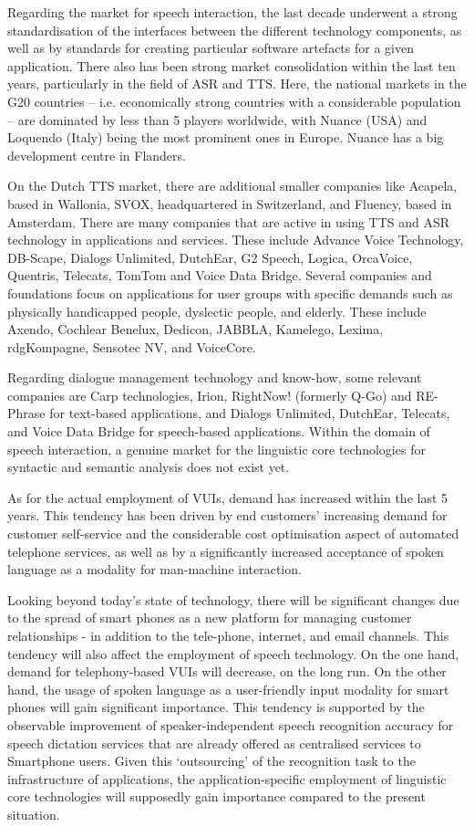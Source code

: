 \documentclass{scrartcl}
\begin{document}
\begin{Parallel}[c]{70mm}{70mm}
{    Regarding the market for speech interaction, the last decade underwent a strong standardisation of the interfaces between the different technology components, as well as by standards for creating particular software artefacts for a given application. There also has been strong market consolidation within the last ten years, particularly in the field of ASR and TTS. Here, the national markets in the G20 countries -- i.e. economically strong countries with a considerable population -- are dominated by less than 5 players worldwide, with Nuance (USA) and Loquendo (Italy) being the most prominent ones in Europe. Nuance has a big development centre in Flanders.

    On the Dutch TTS market, there are additional smaller companies like Acapela, based in Wallonia, SVOX, headquartered in Switzerland, and Fluency, based in Amsterdam. There are many companies that are active in using TTS and ASR technology in applications and services. These include Advance Voice Technology, DB-Scape, Dialogs Unlimited, DutchEar,   G2 Speech,  Logica, OrcaVoice, Quentris, Telecats, TomTom and Voice Data Bridge. Several companies and foundations focus on applications for user groups with specific demands such as physically handicapped people, dyslectic people, and elderly. These include Axendo, Cochlear Benelux, Dedicon, JABBLA, Kamelego, Lexima, rdgKompagne, Sensotec NV, and VoiceCore.

    Regarding dialogue management technology and know-how, some relevant companies are Carp technologies, Irion,  RightNow! (formerly Q-Go) and  RE-Phrase for text-based applications, and  Dialogs Unlimited, DutchEar, Telecats, and Voice Data Bridge for speech-based applications. Within the domain of speech interaction, a genuine market for the linguistic core technologies for syntactic and semantic analysis does not exist yet.

    As for the actual employment of VUIs, demand has increased within the last 5 years. This tendency has been driven by end customers' increasing demand for customer self-service and the considerable cost optimisation aspect of automated telephone services, as well as by a significantly increased acceptance of spoken language as a modality for man-machine interaction.

    Looking beyond today's state of technology, there will be significant changes due to the spread of smart phones as a new platform for managing customer relationships - in addition to the tele-phone, internet, and email channels. This tendency will also affect the employment of speech technology. On the one hand, demand for telephony-based VUIs will decrease, on the long run. On the other hand, the usage of spoken language as a user-friendly input modality for smart phones will gain significant importance. This tendency is supported by the observable improvement of speaker-independent speech recognition accuracy for speech dictation services that are already offered as centralised services to Smartphone users. Given this `outsourcing' of the recognition task to the infrastructure of applications, the application-specific employment of linguistic core technologies will supposedly gain importance compared to the present situation.

}
\end{Parallel}
\end{document}
